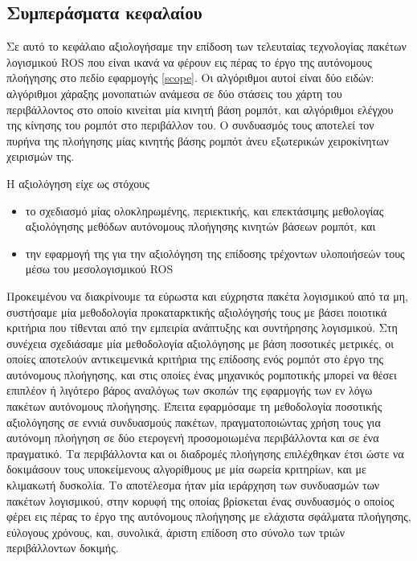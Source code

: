 \subsection{Συμπεράσματα κεφαλαίου}

Σε αυτό το κεφάλαιο αξιολογήσαμε την επίδοση των τελευταίας τεχνολογίας πακέτων
λογισμικού ROS που είναι ικανά να φέρουν εις πέρας το έργο της αυτόνομους
πλοήγησης στο πεδίο εφαρμογής \ref{scope}. Οι αλγόριθμοι αυτοί είναι δύο ειδών:
αλγόριθμοι χάραξης μονοπατιών ανάμεσα σε δύο στάσεις του χάρτη του περιβάλλοντος
στο οποίο κινείται μία κινητή βάση ρομπότ, και αλγόριθμοι ελέγχου της κίνησης
του ρομπότ στο περιβάλλον του. Ο συνδυασμός τους αποτελεί τον πυρήνα της
πλοήγησης μίας κινητής βάσης ρομπότ άνευ εξωτερικών χειροκίνητων χειρισμών της.

Η αξιολόγηση είχε ως στόχους
\begin{itemize}
  \item το σχεδιασμό μίας ολοκληρωμένης, περιεκτικής, και επεκτάσιμης
        μεθολογίας αξιολόγησης μεθόδων αυτόνομους πλοήγησης κινητών βάσεων
        ρομπότ, και
  \item την εφαρμογή της για την αξιολόγηση της επίδοσης τρέχοντων υλοποιήσεών
        τους μέσω του μεσολογισμικού ROS
\end{itemize}

Προκειμένου να διακρίνουμε τα εύρωστα και εύχρηστα πακέτα λογισμικού από τα μη,
συστήσαμε μία μεθοδολογία προκαταρκτικής αξιολόγησής τους με βάσει ποιοτικά
κριτήρια που τίθενται από την εμπειρία ανάπτυξης και συντήρησης λογισμικού.
Στη συνέχεια σχεδιάσαμε μία μεθοδολογία αξιολόγησης με βάση ποσοτικές μετρικές,
οι οποίες αποτελούν αντικειμενικά κριτήρια της επίδοσης ενός ρομπότ στο έργο
της αυτόνομους πλοήγησης, και στις οποίες ένας μηχανικός ρομποτικής μπορεί να
θέσει επιπλέον ή λιγότερο βάρος αναλόγως των σκοπών της εφαρμογής των εν λόγω
πακέτων αυτόνομους πλοήγησης. Έπειτα εφαρμόσαμε τη μεθοδολογία ποσοτικής
αξιολόγησης σε εννιά συνδυασμούς πακέτων, πραγματοποιώντας χρήση τους για
αυτόνομη πλοήγηση σε δύο ετερογενή προσομοιωμένα περιβάλλοντα και σε ένα
πραγματικό. Τα περιβάλλοντα και οι διαδρομές πλοήγησης επιλέχθηκαν έτσι ώστε
να δοκιμάσουν τους υποκείμενους αλγορίθμους με μία σωρεία κριτηρίων, και με
κλιμακωτή δυσκολία. Το αποτέλεσμα ήταν μία ιεράρχηση των συνδυασμών των πακέτων
λογισμικού, στην κορυφή της οποίας βρίσκεται ένας συνδυασμός ο οποίος φέρει
εις πέρας το έργο της αυτόνομους πλοήγησης με ελάχιστα σφάλματα πλοήγησης,
εύλογους χρόνους, και, συνολικά, άριστη επίδοση στο σύνολο των τριών
περιβάλλοντων δοκιμής.


